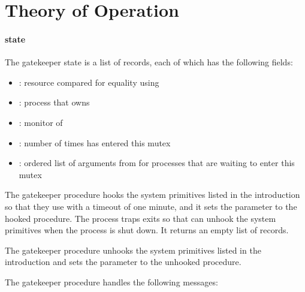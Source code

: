 \section {Theory of Operation}

\paragraph* {state} The gatekeeper state is a
list of 
records, each of which has the following fields:\antipar

\begin{itemize}
\item {}: resource compared for equality using 
\item {}: process that owns 
\item {}: monitor of 
\item {}: number of times  has entered this
  mutex
\item {}: ordered list of  arguments from
   for processes that are waiting to enter this
  mutex
\end{itemize}

 The gatekeeper  procedure
hooks the system primitives listed in the introduction so that they
use  with a timeout of one minute, and it sets the
 parameter to the hooked 
procedure. The process traps exits so that  can unhook
the system primitives when the process is shut down. It returns an
empty list of  records.

 The gatekeeper 
procedure unhooks the system primitives listed in the introduction and
sets the  parameter to the unhooked
 procedure.

 The gatekeeper
 procedure handles the following messages:\antipar

